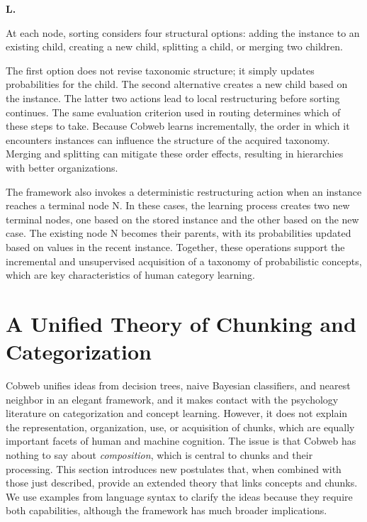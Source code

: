 \documentclass[11pt,letterpaper]{article}
\newcounter{lpostulate}
\newenvironment{lpost}{%
  \stepcounter{lpostulate}%
  \par\noindent
  \hangindent=21pt\hangafter=1%
  \textbf{L\thelpostulate.}~\ignorespaces
  \setlength{\parindent}{0pt}%
  \setlength{\parskip}{4pt}%
}{%
  \par\smallskip
}
\begin{document}
\vskip 0.05in

\begin{lpost}
At each node, sorting considers four structural options: adding
the instance to an existing child, creating a new child, splitting
a child, or merging two children.
\end{lpost}

\vskip 0.02in
\noindent
The first option does not revise taxonomic structure; it simply 
updates probabilities for the child. The second alternative creates
a new child based on the instance. The latter two actions lead to
local restructuring before sorting continues. The same evaluation
criterion used in routing determines which of these steps to take.
Because Cobweb learns incrementally, the order in which it encounters
instances can influence the structure of the acquired taxonomy.
Merging and splitting can mitigate these order effects, resulting 
in hierarchies with better organizations.

The framework also invokes a deterministic restructuring action
when an instance reaches a terminal node N. In these cases, the
learning process creates two new terminal nodes, one based on the
stored instance and the other based on the new case. The existing
node N becomes their parents, with its probabilities updated based 
on values in the recent instance. Together, these operations 
support the incremental and unsupervised acquisition of a taxonomy 
of probabilistic concepts, which are key characteristics of human 
category learning. 


\section{A Unified Theory of Chunking and Categorization}

Cobweb unifies ideas from decision trees, naive Bayesian classifiers,
and nearest neighbor in an elegant framework, and it makes contact
with the psychology literature on categorization and concept learning.
However, it does not explain the representation, organization, use,
or acquisition of chunks, which are equally important facets of
human and machine cognition. The issue is that Cobweb has nothing
to say about {\it composition\/}, which is central to chunks and their
processing. This section introduces new postulates that, when combined
with those just described, provide an extended theory that links
concepts and chunks. We use examples from language syntax to clarify 
the ideas because they require both capabilities, although the
framework has much broader implications.
\end{document}

